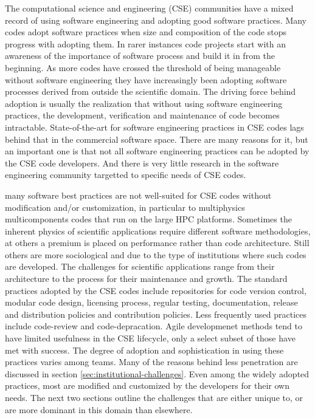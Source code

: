 \label{sec:introduction}
The computational science and engineering (CSE) communities have a mixed record
of using software engineering and adopting good software
practices. Many codes adopt software practices when size and
composition of the code stops progress with adopting them.  In rarer instances code projects start with
an awareness of the importance of software process and build it in
from the beginning. As more codes have crossed the threshold of being 
manageable without software engineering they have increasingly been  
adopting software processes derived from outside the scientific
domain. The driving force behind adoption is usually the realization
that without using software engineering practices, the development,
verification and maintenance of code becomes
intractable. State-of-the-art for software engineering
practices in CSE codes lags behind that in the commercial software
space. There are many reasons for it, but an important one is that
not all software engineering practices can be adopted by the CSE code
developers. And there is very little research in the software
engineering community targetted to specific needs of CSE codes.

many software best practices are not well-suited for CSE codes without
modification and/or customization, in particular to multiphysics
multicomponents codes that run on the large HPC platforms. Sometimes
the inherent physics of scientific applications require different
software methodologies, at others a premium is placed on
performance rather than code architecture.  Still others are more
sociological and due to the type of institutions where such codes are
developed. The challenges for scientific applications range
from their architecture to the process for their maintenance and
growth. The standard practices adopted by the CSE codes include
repositories for code version control, modular code design, licensing
process, regular testing, documentation, release and distribution
policies and contribution policies. Less frequently used practices
include code-review and code-depracation. Agile developmenet methods
tend to have limited usefulness in the CSE lifecycle, only a
select subset of those have met with success. The degree of adoption and
sophistication in using these  practices varies among teams. Many of
the reasons behind less penetration are discussed in section
\ref{sec:institutional-challenges}. Even among the widely adopted
practices, most are modified and customized by the developers for
their own needs. The next two sections outline the  challenges that
are either unique to, or are more dominant in this domain than
elsewhere.  


